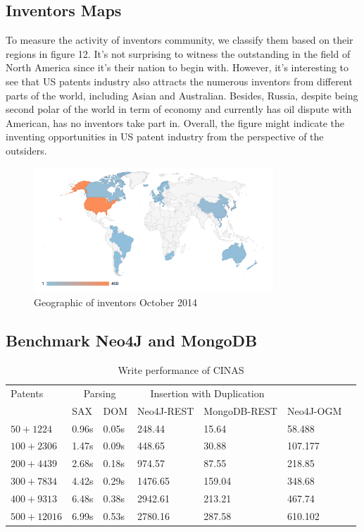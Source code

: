 \documentclass{sig-alternate}
\begin{document}
{ \subsection{Inventors Maps}
To measure the activity of inventors community, we classify them based on their regions in figure 12. It's not surprising to witness the outstanding in the field of North America since it's their nation to begin with. However, it's interesting to see that US patents industry also attracts the numerous inventors from different parts of the world, including Asian and Australian. Besides, Russia, despite being second polar of the world in term of economy and currently has oil dispute with American, has no inventors take part in. Overall, the figure might indicate the inventing opportunities in US patent industry from the perspective of the outsiders.
 \begin{figure}[!htb]
\centering
\includegraphics[width=90mm]{inventor-map.png}
\caption{ Geographic of inventors October 2014 }
\end{figure}

 \subsection{Benchmark Neo4J and MongoDB}
 \begin{table}[ht]
 \centering

\begin{tabular}{lllllll}
\toprule 
    Patents & \multicolumn{2}{c}{Parsing} &\multicolumn{2}{c}{Insertion with Duplication}\\

    & SAX & DOM 
    & Neo4J-REST & MongoDB-REST & Neo4J-OGM\\
    \midrule
    $50 + 1224$     & 0.96s & 0.05s  &248.44 & 15.64 & 58.488 \\
    $100 + 2306$  & 1.47s & 0.09s &448.65 & 30.88 & 107.177\\
    $200 + 4439$  & 2.68s & 0.18s&974.57 & 87.55 & 218.85\\
    $300 + 7834$  & 4.42s& 0.29s&1476.65 & 159.04 & 348.68\\
    $400 + 9313$  & 6.48s & 0.38s&2942.61 & 213.21 & 467.74\\
    $500 + 12016$  & 6.99s& 0.53s &2780.16 & 287.58 & 610.102\\
    \bottomrule
\end{tabular}
\caption{Write performance of CINAS}
\end{table}

}
\end{document}

